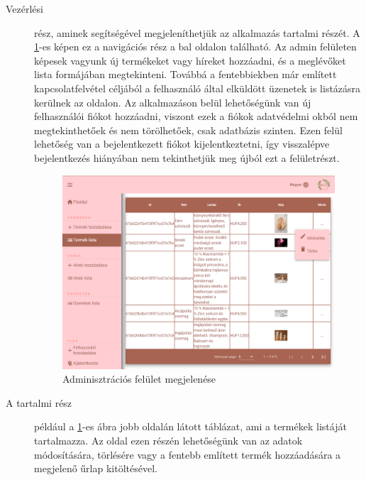 \begin{description}
	\item[Vezérlési]rész, aminek segítségével megjeleníthetjük az alkalmazás tartalmi részét. A \ref{fig.exemple-7}-es képen ez a navigációs rész a bal oldalon található. Az admin felületen képesek vagyunk új termékeket vagy híreket hozzáadni, és a meglévőket lista formájában megtekinteni. Továbbá a fentebbiekben már említett kapcsolatfelvétel céljából a felhasználó által elküldött üzenetek is listázásra kerülnek az oldalon. Az alkalmazáson belül lehetőségünk van új felhasználói fiókot hozzáadni, viszont ezek a fiókok adatvédelmi okból nem megtekinthetőek és nem törölhetőek, csak adatbázis szinten. Ezen felül lehetőség van a bejelentkezett fiókot kijelentkeztetni, így visszalépve bejelentkezés hiányában nem tekinthetjük meg újból ezt a felületrészt.
	\begin{figure}[H]
		\centering
		\includegraphics[width=1.0\textwidth]{images/admin.png}
		\caption{Adminisztrációs felület megjelenése}
		\label{fig.exemple-7}
	\end{figure}
	\item[A tartalmi rész] például a \ref{fig.exemple-7}-es ábra jobb oldalán látott táblázat, ami a  termékek listáját tartalmazza. Az oldal ezen részén lehetőségünk van az adatok módosítására, törlésére vagy a fentebb említett termék hozzáadására a megjelenő űrlap kitöltésével.
\end{description}

